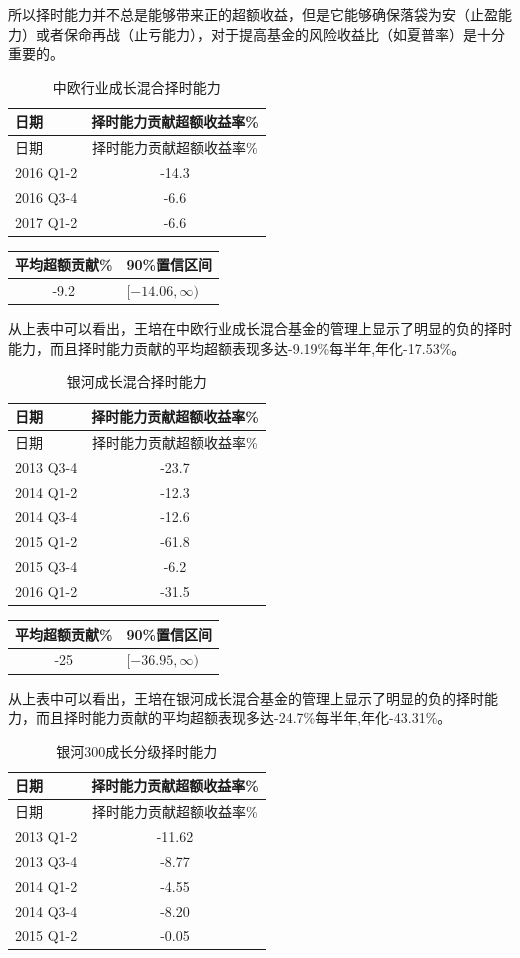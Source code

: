 \documentclass[hyperref,]{ctexart}
\begin{document}
所以择时能力并不总是能够带来正的超额收益，但是它能够确保落袋为安（止盈能力）或者保命再战（止亏能力），对于提高基金的风险收益比（如夏普率）是十分重要的。

\begin{longtable}[]{@{}lc@{}}
\caption{中欧行业成长混合择时能力}\tabularnewline
\toprule
日期 & 择时能力贡献超额收益率\%\tabularnewline
\midrule
\endfirsthead
\toprule
日期 & 择时能力贡献超额收益率\%\tabularnewline
\midrule
\endhead
2016 Q1-2 & -14.3\tabularnewline
2016 Q3-4 & -6.6\tabularnewline
2017 Q1-2 & -6.6\tabularnewline
\bottomrule
\end{longtable}

\begin{longtable}[]{@{}cl@{}}
\toprule
平均超额贡献\% & 90\%置信区间\tabularnewline
\midrule
\endhead
-9.2 & \([-14.06,\infty)\)\tabularnewline
\bottomrule
\end{longtable}

从上表中可以看出，王培在中欧行业成长混合基金的管理上显示了明显的负的择时能力，而且择时能力贡献的平均超额表现多达-9.19\%每半年,年化-17.53\%。

\begin{longtable}[]{@{}lc@{}}
\caption{银河成长混合择时能力}\tabularnewline
\toprule
日期 & 择时能力贡献超额收益率\%\tabularnewline
\midrule
\endfirsthead
\toprule
日期 & 择时能力贡献超额收益率\%\tabularnewline
\midrule
\endhead
2013 Q3-4 & -23.7\tabularnewline
2014 Q1-2 & -12.3\tabularnewline
2014 Q3-4 & -12.6\tabularnewline
2015 Q1-2 & -61.8\tabularnewline
2015 Q3-4 & -6.2\tabularnewline
2016 Q1-2 & -31.5\tabularnewline
\bottomrule
\end{longtable}

\begin{longtable}[]{@{}cl@{}}
\toprule
平均超额贡献\% & 90\%置信区间\tabularnewline
\midrule
\endhead
-25 & \([-36.95,\infty)\)\tabularnewline
\bottomrule
\end{longtable}

从上表中可以看出，王培在银河成长混合基金的管理上显示了明显的负的择时能力，而且择时能力贡献的平均超额表现多达-24.7\%每半年,年化-43.31\%。

\begin{longtable}[]{@{}lc@{}}
\caption{银河300成长分级择时能力}\tabularnewline
\toprule
日期 & 择时能力贡献超额收益率\%\tabularnewline
\midrule
\endfirsthead
\toprule
日期 & 择时能力贡献超额收益率\%\tabularnewline
\midrule
\endhead
2013 Q1-2 & -11.62\tabularnewline
2013 Q3-4 & -8.77\tabularnewline
2014 Q1-2 & -4.55\tabularnewline
2014 Q3-4 & -8.20\tabularnewline
2015 Q1-2 & -0.05\tabularnewline
\bottomrule
\end{longtable}
\end{document}

